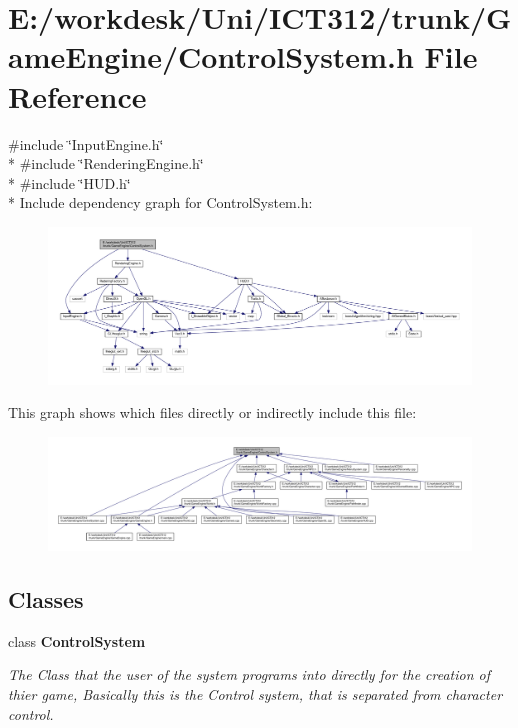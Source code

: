 \section{E\+:/workdesk/\+Uni/\+I\+C\+T312/trunk/\+Game\+Engine/\+Control\+System.h File Reference}
\label{_control_system_8h}
{\ttfamily \#include \char`\"{}Input\+Engine.\+h\char`\"{}}\\*
{\ttfamily \#include \char`\"{}Rendering\+Engine.\+h\char`\"{}}\\*
{\ttfamily \#include \char`\"{}H\+U\+D.\+h\char`\"{}}\\*
Include dependency graph for Control\+System.\+h\+:\nopagebreak
\begin{figure}[H]
\begin{center}
\leavevmode
\includegraphics[width=350pt]{d3/d5f/_control_system_8h__incl}
\end{center}
\end{figure}
This graph shows which files directly or indirectly include this file\+:
\nopagebreak
\begin{figure}[H]
\begin{center}
\leavevmode
\includegraphics[width=350pt]{d2/d70/_control_system_8h__dep__incl}
\end{center}
\end{figure}
\subsection*{Classes}
\begin{DoxyCompactItemize}
\item 
class {\bf Control\+System}
\begin{DoxyCompactList}\small\item\em The Class that the user of the system programs into directly for the creation of thier game, Basically this is the Control system, that is separated from character control. \end{DoxyCompactList}\end{DoxyCompactItemize}
